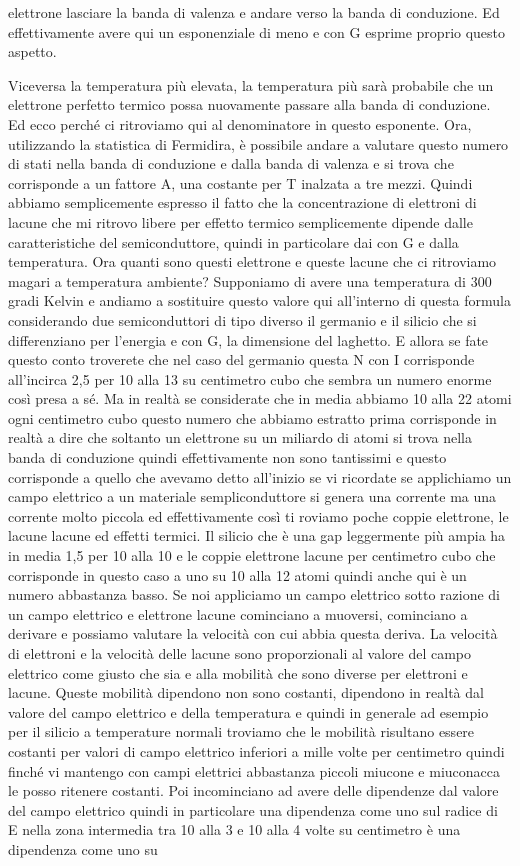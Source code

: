 elettrone lasciare la banda di valenza e andare verso la banda di conduzione. Ed effettivamente avere qui un esponenziale di meno e con G esprime proprio questo aspetto.

Viceversa la temperatura più elevata, la temperatura più sarà probabile che un elettrone perfetto termico possa nuovamente passare alla banda di conduzione. Ed ecco perché ci ritroviamo qui al denominatore in questo esponente. Ora, utilizzando la statistica di Fermidira, è possibile andare a valutare questo numero di stati nella banda di conduzione e dalla banda di valenza e si trova che corrisponde a un fattore A, una costante per T inalzata a tre mezzi. Quindi abbiamo semplicemente espresso il fatto che la concentrazione di elettroni di lacune che mi ritrovo libere per effetto termico semplicemente dipende dalle caratteristiche del semiconduttore, quindi in particolare dai con G e dalla temperatura. Ora quanti sono questi elettrone e queste lacune che ci ritroviamo magari a temperatura ambiente? Supponiamo di avere una temperatura di 300 gradi Kelvin e andiamo a sostituire questo valore qui all'interno di questa formula considerando due semiconduttori di tipo diverso il germanio e il silicio che si differenziano per l'energia e con G, la dimensione del laghetto. E allora se fate questo conto troverete che nel caso del germanio questa N con I corrisponde all'incirca 2,5 per 10 alla 13 su centimetro cubo che sembra un numero enorme così presa a sé. Ma in realtà se considerate che in media abbiamo 10 alla 22 atomi ogni centimetro cubo questo numero che abbiamo estratto prima corrisponde in realtà a dire che soltanto un elettrone su un miliardo di atomi si trova nella banda di conduzione quindi effettivamente non sono tantissimi e questo corrisponde a quello che avevamo detto all'inizio se vi ricordate se applichiamo un campo elettrico a un materiale sempliconduttore si genera una corrente ma una corrente molto piccola ed effettivamente così ti roviamo poche coppie elettrone, le lacune lacune ed effetti termici. Il silicio che è una gap leggermente più ampia ha in media 1,5 per 10 alla 10 e le coppie elettrone lacune per centimetro cubo che corrisponde in questo caso a uno su 10 alla 12 atomi quindi anche qui è un numero abbastanza basso. Se noi appliciamo un campo elettrico sotto razione di un campo elettrico e elettrone lacune cominciano a muoversi, cominciano a derivare e possiamo valutare la velocità con cui abbia questa deriva. La velocità di elettroni e la velocità delle lacune sono proporzionali al valore del campo elettrico come giusto che sia e alla mobilità che sono diverse per elettroni e lacune. Queste mobilità dipendono non sono costanti, dipendono in realtà dal valore del campo elettrico e della temperatura e quindi in generale ad esempio per il silicio a temperature normali troviamo che le mobilità risultano essere costanti per valori di campo elettrico inferiori a mille volte per centimetro quindi finché vi mantengo con campi elettrici abbastanza piccoli miucone e miuconacca le posso ritenere costanti. Poi incominciano ad avere delle dipendenze dal valore del campo elettrico quindi in particolare una dipendenza come uno sul radice di E nella zona intermedia tra 10 alla 3 e 10 alla 4 volte su centimetro è una dipendenza come uno su 